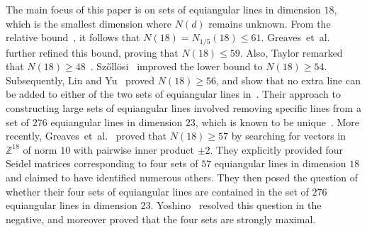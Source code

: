 \documentclass[reqno, 11pt]{amsart}
\numberwithin{equation}{section}
\theoremstyle{definition}
\newcommand{\Z}{\mathbb{Z}}
\begin{document}
The main focus of this paper is on sets of equiangular lines in dimension $18$, which is the smallest dimension where $N(d)$ remains unknown.
From the relative bound~\cite{lemmens1973}, it follows that $N(18) = N_{1/5}(18) \leq 61$.
Greaves~et~al.~\cite{Greaves2022} further refined this bound, proving that $N(18) \leq 59$.
Also, Taylor remarked that $N(18) \geq 48$~\cite[p.~124]{Daniel1971}.
Sz\H{o}ll\"osi~\cite{Szollosi2019} improved the lower bound to $N(18) \geq 54$.
Subsequently, Lin and Yu~\cite{Lin2020b} proved $N(18) \geq 56$, and show that no extra line can be added to either of the two sets of equiangular lines in~\cite{Lin2020b, Szollosi2019}.
Their approach to constructing large sets of equiangular lines involved removing specific lines from a set of $276$ equiangular lines in dimension $23$, which is known to be unique~\cite[Theorem~A]{goethals1975}.
More recently, Greaves~et~al.~\cite{Greaves2023} proved that $N(18) \geq 57$ by searching for vectors in $\Z^{18}$ of norm $10$ with pairwise inner product $\pm 2$.
They explicitly provided four Seidel matrices corresponding to four sets of $57$ equiangular lines in dimension $18$ and claimed to have identified numerous others.
They then posed the question of whether their four sets of equiangular lines are contained in the set of $276$ equiangular lines in dimension $23$.
Yoshino~\cite{yoshino2022} resolved this question in the negative, and moreover proved that the four sets are strongly maximal.
\end{document}
